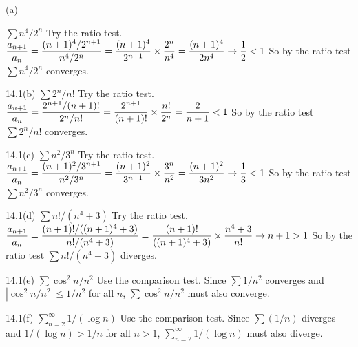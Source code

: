 (a)

$\sum n^4/2^n$ Try the ratio test.
\medskip
$\displaystyle{
{a_{n+1}\over a_n}
={(n+1)^4/2^{n+1}\over n^4/2^n}
={(n+1)^4\over2^{n+1}}\times{2^n\over n^4}
={(n+1)^4\over2n^4}\rightarrow{1\over2}<1}$
\medskip
So by the ratio test $\sum n^4/2^n$ converges.

\bigskip

14.1(b) $\sum2^n/n!$ Try the ratio test.
\medskip
$\displaystyle{{a_{n+1}\over a_n}={2^{n+1}/(n+1)!\over 2^n/n!}
={2^{n+1}\over(n+1)!}\times{n!\over2^n}={2\over n+1}<1}$
\medskip
So by the ratio test $\sum2^n/n!$ converges.

\bigskip

14.1(c) $\sum n^2/3^n$ Try the ratio test.
\medskip
$\displaystyle{
{a_{n+1}\over a_n}
={(n+1)^2/3^{n+1}\over n^2/3^n}
={(n+1)^2\over 3^{n+1}}\times{3^n\over n^2}
={(n+1)^2\over3n^2}\rightarrow{1\over3}<1
}$
\medskip
So by the ratio test $\sum n^2/3^n$ converges.

\bigskip

14.1(d) $\sum n!/(n^4+3)$ Try the ratio test.
\medskip
$\displaystyle{
{a_{n+1}\over a_n}
={(n+1)!/((n+1)^4+3)\over n!/(n^4+3)}
={(n+1)!\over((n+1)^4+3)}\times{n^4+3\over n!}
\rightarrow n+1>1
}$
\medskip
So by the ratio test $\sum n!/(n^4+3)$ diverges.

\bigskip

14.1(e) $\sum\cos^2 n/n^2$ Use the comparison test.
Since $\sum1/n^2$ converges and
$|\cos^2 n/n^2|\le1/n^2$ for all $n$, $\sum\cos^2 n/n^2$ must also converge.

\bigskip

14.1(f) $\sum_{n=2}^\infty1/(\log n)$ Use the comparison test.
Since $\sum(1/n)$ diverges and $1/(\log n)>1/n$ for all $n>1$,
$\sum_{n=2}^\infty1/(\log n)$ must also diverge.
